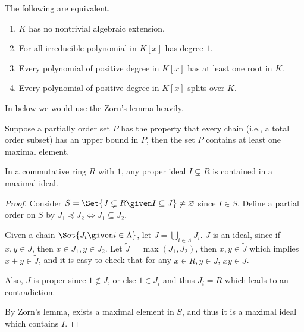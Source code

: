 \begin{prop}
  The following are equivalent.
  \begin{enumerate}
    \item $K$ has no nontrivial algebraic extension.
    \item For all irreducible polynomial in $K[x]$ has degree $1$.
    \item Every polynomial of  positive degree in $K[x]$ has at least one root in $K$.
    \item Every polynomial of  positive degree in $K[x]$ splits over $K$.
  \end{enumerate}
\end{prop}

In below we would use the Zorn's lemma heavily.
\begin{lemma}
  Suppose a partially order set $P$ has the property that every chain (i.e., a total order subset)
  has an upper bound in $P$, then the set $P$ contains at least one maximal element.
\end{lemma}

\begin{lemma} \label{lemma:max-ideal-exists}
  In a commutative ring $R$ with $1$, any proper ideal $I \subsetneq R$ is contained in a maximal ideal.

  \begin{proof}
    Consider $S = \Set{J \subsetneq R \given I \subseteq J} \neq \varnothing$ since $I \in S$.
    Define a partial order on $S$ by $J_1 \preceq J_2 \iff J_1 \subseteq J_2$.

    Given a chain $\Set{J_i \given i \in \Lambda}$, let $J = \bigcup_{i \in \Lambda} J_i$. $J$ is an
    ideal, since if $x, y \in J$, then $x \in J_1, y \in J_2$.
    Let $\tilde{J} = \max(J_1, J_2)$, then $x, y \in \tilde{J}$
    which implies $x + y \in \tilde{J}$, and it is easy to check that for any $x \in R, y \in J$, $xy \in J$.

    Also, $J$ is proper since $1 \not\in J$, or else $1 \in J_i$ and thus $J_i = R$ which leads to
    an contradiction.

    By Zorn's lemma, exists a maximal element in $S$, and thus it is a maximal ideal which contains $I$.
  \end{proof}
\end{lemma}


